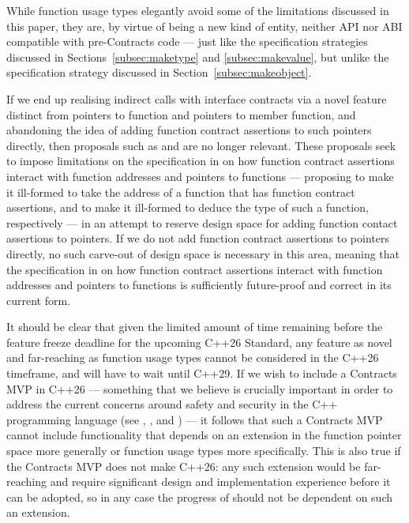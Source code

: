 While function usage types elegantly avoid some of the limitations discussed in this paper, they are, by virtue of being a new kind of entity, neither API nor ABI compatible with pre-Contracts code --- just like the specification strategies discussed in Sections~\ref{subsec:maketype} and \ref{subsec:makevalue}, but unlike the specification strategy discussed in Section~\ref{subsec:makeobject}.

If we end up realising indirect calls with interface contracts via a novel feature distinct from pointers to function and pointers to member function, and abandoning the idea of adding function contract assertions to such pointers directly, then proposals such as \cite{P3221R0} and \cite{P3250R0} are no longer relevant. These proposals seek to impose limitations on the specification in \cite{P2900R7} on how function contract assertions interact with function addresses and pointers to functions --- proposing to make it ill-formed to take the address of a function that has function contract assertions, and to make it ill-formed to deduce the type of such a function, respectively --- in an attempt to reserve design space for adding function contact assertions to pointers. If we do not add function contract assertions to pointers directly, no such carve-out of design space is necessary in this area, meaning that the specification in \cite{P2900R7} on how function contract assertions interact with function addresses and pointers to functions is sufficiently future-proof and correct in its current form.

It should be clear that given the limited amount of time remaining before the feature freeze deadline for the upcoming C++26 Standard, any feature as novel and far-reaching as function usage types cannot be considered in the C++26 timeframe, and will have to wait until C++29. If we wish to include a Contracts MVP in C++26 --- something that we believe is crucially important in order to address the current concerns around safety and security in the C++ programming language (see \cite{P3269R0}, \cite{P3276R0}, and \cite{P3297R0}) --- it follows that such a Contracts MVP cannot include functionality that depends on an extension in the function pointer space more generally or function usage types more specifically. This is also true if the Contracts MVP does not make C++26: any such extension would be far-reaching and require significant design and implementation experience before it can be adopted, so in any case the progress of \cite{P2900R7} should not be dependent on such an extension.

